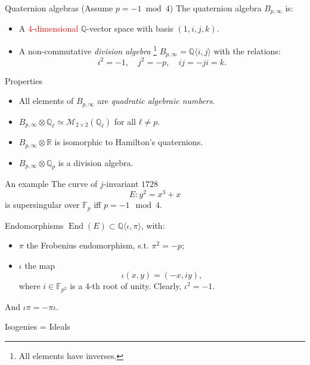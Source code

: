 \documentclass[aspectratio=169]{beamer}
\newcommand{\F}{\mathbb{F}}
\newcommand{\End}{\operatorname{End}}
\newcommand{\Hom}{\operatorname{Hom}}
\begin{document}
\begin{frame}{\color{red}Quaternion algebras}
  (Assume $p=-1 \bmod 4$) The quaternion algebra \emph{$B_{p,∞}$} is:
  \begin{itemize}
  \item A \textcolor{red}{$4$-dimensional} $ℚ$-vector space with basis
    \emph{$(1,i,j,k)$}.
  \item A non-commutative \emph{division algebra}%
    \footnote{All elements have inverses.} %
    $B_{p,∞} = ℚ〈i,j〉$ with the relations:
    \[i^2 = -1, \quad j^2 = -p, \quad ij = -ji = k.\]
  \end{itemize}

  \begin{block}{Properties}
    \begin{itemize}
    \item All elements of $B_{p,∞}$ are \emph{quadratic algebraic
        numbers}.
    \item $B_{p,∞}⊗ℚ_ℓ≃\mathcal{M}_{2×2}(ℚ_ℓ)$ for all $ℓ≠p$.\\
    \item $B_{p,∞}⊗ℝ$ is isomorphic to Hamilton's quaternions.
    \item $B_{p,∞}⊗ℚ_p$ is a division algebra.
    \end{itemize}
  \end{block}
\end{frame}


\begin{frame}{An example}
  The curve of $j$-invariant \emph{$1728$}
  \[E: y^2 = x^3 + x\]
  is supersingular over $\F_p$ iff $p=-1\mod 4$.

  \begin{block}{Endomorphisms}
    \emph{$\End(E) ⊂ ℚ〈ι,π〉$}, with:
    \begin{itemize}
    \item $π$ the Frobenius endomorphism, s.t. \emph{$π^2=-p$};
    \item $ι$ the map
      \[ι(x,y) = (-x,iy),\]
      where \emph{$i∈\F_{p^2}$} is a 4-th root of unity.
      Clearly, \emph{$ι^2=-1$}.
    \end{itemize}
    And \emph{$ιπ=-πι$}.
  \end{block}
\end{frame}


\begin{frame}{Isogenies = Ideals}
  \large\centering
\end{frame}
\end{document}
